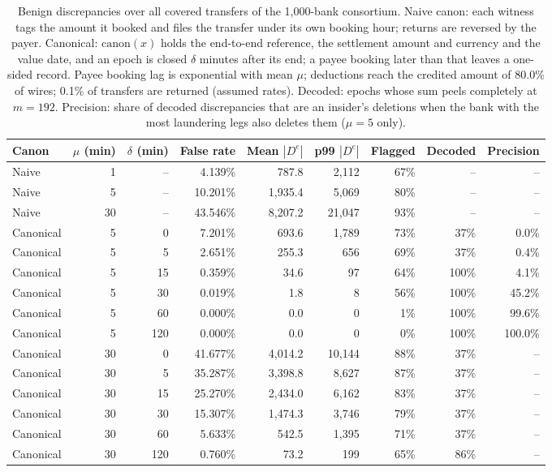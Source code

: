 \begin{table}[!htbp]\centering\small
\caption{Benign discrepancies over all covered transfers of the 1,000-bank consortium. Naive canon: each witness tags the amount it booked and files the transfer under its own booking hour; returns are reversed by the payer. Canonical: $\mathrm{canon}(x)$ holds the end-to-end reference, the settlement amount and currency and the value date, and an epoch is closed $\delta$ minutes after its end; a payee booking later than that leaves a one-sided record. Payee booking lag is exponential with mean $\mu$; deductions reach the credited amount of 80.0\% of wires; 0.1\% of transfers are returned (assumed rates). Decoded: epochs whose sum peels completely at $m=192$. Precision: share of decoded discrepancies that are an insider's deletions when the bank with the most laundering legs also deletes them ($\mu=5$ only).}\label{tab:benign}
\begin{adjustbox}{max width=\linewidth}\begin{tabular}{lrrrrrrrr}\toprule
Canon & $\mu$ (min) & $\delta$ (min) & False rate & Mean $|D^e|$ & p99 $|D^e|$ & Flagged & Decoded & Precision \\\midrule
Naive & 1 & -- & 4.139\% & 787.8 & 2{,}112 & 67\% & -- & -- \\
Naive & 5 & -- & 10.201\% & 1{,}935.4 & 5{,}069 & 80\% & -- & -- \\
Naive & 30 & -- & 43.546\% & 8{,}207.2 & 21{,}047 & 93\% & -- & -- \\
Canonical & 5 & 0 & 7.201\% & 693.6 & 1{,}789 & 73\% & 37\% & 0.0\% \\
Canonical & 5 & 5 & 2.651\% & 255.3 & 656 & 69\% & 37\% & 0.4\% \\
Canonical & 5 & 15 & 0.359\% & 34.6 & 97 & 64\% & 100\% & 4.1\% \\
Canonical & 5 & 30 & 0.019\% & 1.8 & 8 & 56\% & 100\% & 45.2\% \\
Canonical & 5 & 60 & 0.000\% & 0.0 & 0 & 1\% & 100\% & 99.6\% \\
Canonical & 5 & 120 & 0.000\% & 0.0 & 0 & 0\% & 100\% & 100.0\% \\
Canonical & 30 & 0 & 41.677\% & 4{,}014.2 & 10{,}144 & 88\% & 37\% & -- \\
Canonical & 30 & 5 & 35.287\% & 3{,}398.8 & 8{,}627 & 87\% & 37\% & -- \\
Canonical & 30 & 15 & 25.270\% & 2{,}434.0 & 6{,}162 & 83\% & 37\% & -- \\
Canonical & 30 & 30 & 15.307\% & 1{,}474.3 & 3{,}746 & 79\% & 37\% & -- \\
Canonical & 30 & 60 & 5.633\% & 542.5 & 1{,}395 & 71\% & 37\% & -- \\
Canonical & 30 & 120 & 0.760\% & 73.2 & 199 & 65\% & 86\% & -- \\
\bottomrule\end{tabular}\end{adjustbox}\end{table}
